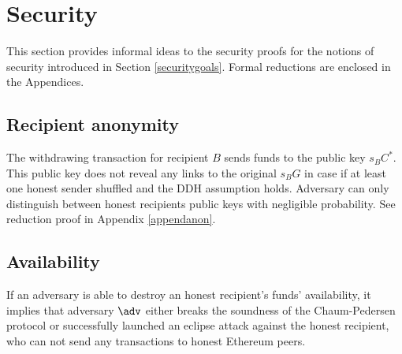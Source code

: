 \documentclass[a4paper]{article}
\theoremstyle{definition}
\begin{document}
\section{Security}
This section provides informal ideas to the security proofs for the notions of security introduced in Section \ref{securitygoals}. Formal reductions are enclosed in the Appendices.

\subsection{Recipient anonymity}
The withdrawing transaction for recipient $B$ sends funds to the public key $s_{B}C^{*}$. This public key does not reveal any links to the original $s_{B}G$ in case if at least one honest sender shuffled and the DDH assumption holds. Adversary can only distinguish between honest recipients public keys with negligible probability. See reduction proof in Appendix \ref*{appendanon}.
\subsection{Availability}
If an adversary is able to destroy an honest recipient's funds' availability, it implies that adversary $\adv$ either breaks the soundness of the Chaum-Pedersen protocol or successfully launched an eclipse attack against the honest recipient, who can not send any transactions to honest Ethereum peers.
\end{document}
